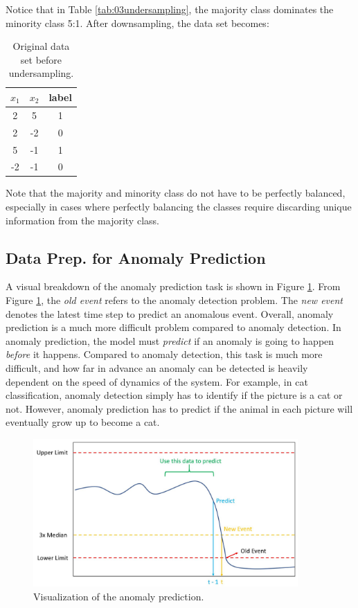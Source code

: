 Notice that in Table \ref{tab:03undersampling}, the majority class dominates the minority class 5:1.  After downsampling, the data set becomes:

\begin{table}[H]
    \centering
    \begin{tabular}{ c | c | c }
        $x_1$ & $x_2$ & label \\
        \hline
        2 & 5 & 1 \\
        2 & -2 & 0 \\
        5 & -1 & 1 \\
        -2 & -1 & 0 \\
    \end{tabular}
    \caption{Original data set before undersampling.}
    \label{tab:03undersampling2}
\end{table}
Note that the majority and minority class do not have to be perfectly balanced, especially in cases where perfectly balancing the classes require discarding unique information from the majority class.

\subsection{Data Prep. for Anomaly Prediction}
A visual breakdown of the anomaly prediction task is shown in Figure \ref{fig:03anomaly_pred}. From Figure \ref{fig:03anomaly_pred}, the \textit{old event} refers to the anomaly detection problem. The \textit{new event} denotes the latest time step to predict an anomalous event. Overall, anomaly prediction is a much more difficult problem compared to anomaly detection.  In anomaly prediction, the model must \textit{predict} if an anomaly is going to happen \textit{before} it happens.  Compared to anomaly detection, this task is much more difficult, and how far in advance an anomaly can be detected is heavily dependent on the speed of dynamics of the system.  For example, in cat classification, anomaly detection simply has to identify if the picture is a cat or not.  However, anomaly prediction has to predict if the animal in each picture will eventually grow up to become a cat.

\begin{figure}[H]
    \centering
    \includegraphics[width=0.9\textwidth]{images/ch3/anomaly_prediction.JPG}
    \caption{Visualization of the anomaly prediction.}
    \label{fig:03anomaly_pred}
\end{figure}

